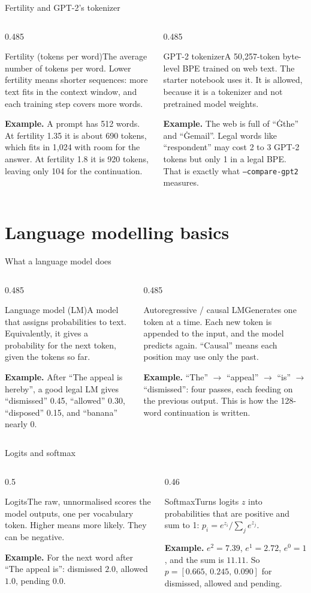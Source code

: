 \documentclass[aspectratio=169,11pt]{beamer}
\newcommand{\code}[1]{\texttt{\small #1}}
\newcommand{\term}[3]{%
  \begin{block}{#1}\small #2\par\vspace{1mm}%
  {\color{exgreen}\textbf{Example.}} #3\end{block}}
\newcommand{\twoterms}[6]{%
  \begin{columns}[T]
    \begin{column}{0.485\textwidth}\term{#1}{#2}{#3}\end{column}
    \begin{column}{0.485\textwidth}\term{#4}{#5}{#6}\end{column}
  \end{columns}}
\begin{document}
\begin{frame}{Fertility and GPT-2's tokenizer}
  \twoterms{Fertility (tokens per word)}
  {The average number of tokens per word. Lower fertility means shorter sequences: more text fits in the context window, and each training step covers more words.}
  {A prompt has 512 words. At fertility 1.35 it is about 690 tokens, which fits in 1,024 with room for the answer. At fertility 1.8 it is 920 tokens, leaving only 104 for the continuation.}
  {GPT-2 tokenizer}
  {A 50,257-token byte-level BPE trained on web text. The starter notebook uses it. It is allowed, because it is a tokenizer and not pretrained model weights.}
  {The web is full of ``Ġthe'' and ``Ġemail''. Legal words like ``respondent'' may cost 2 to 3 GPT-2 tokens but only 1 in a legal BPE. That is exactly what \code{--compare-gpt2} measures.}
\end{frame}

\section{Language modelling basics}

\begin{frame}{What a language model does}
  \twoterms{Language model (LM)}
  {A model that assigns probabilities to text. Equivalently, it gives a probability for the next token, given the tokens so far.}
  {After ``The appeal is hereby'', a good legal LM gives ``dismissed'' 0.45, ``allowed'' 0.30, ``disposed'' 0.15, and ``banana'' nearly 0.}
  {Autoregressive / causal LM}
  {Generates one token at a time. Each new token is appended to the input, and the model predicts again. ``Causal'' means each position may use only the past.}
  {``The'' $\to$ ``appeal'' $\to$ ``is'' $\to$ ``dismissed'': four passes, each feeding on the previous output. This is how the 128-word continuation is written.}
\end{frame}

\begin{frame}{Logits and softmax}
  \begin{columns}[T]
    \begin{column}{0.5\textwidth}
      \term{Logits}
      {The raw, unnormalised scores the model outputs, one per vocabulary token. Higher means more likely. They can be negative.}
      {For the next word after ``The appeal is'': dismissed $2.0$, allowed $1.0$, pending $0.0$.}
    \end{column}
    \begin{column}{0.46\textwidth}
      \term{Softmax}
      {Turns logits $z$ into probabilities that are positive and sum to 1: $p_i=e^{z_i}/\sum_j e^{z_j}$.}
      {$e^{2}=7.39$, $e^{1}=2.72$, $e^{0}=1$, and the sum is $11.11$. So $p=[0.665,\,0.245,\,0.090]$ for dismissed, allowed and pending.}
    \end{column}
  \end{columns}
\end{frame}
\end{document}
